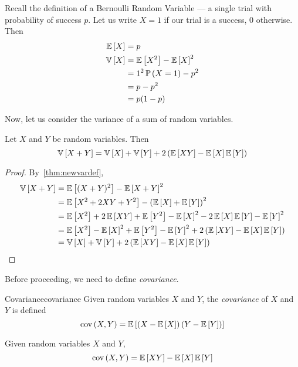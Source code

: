 Recall the definition of a Bernoulli Random Variable --- a single trial with
probability of success $p$. Let us write $X = 1$ if our trial is a success, 0
otherwise. Then
\begin{align*}
    \expectation{X} &= p\\
    \variance{X} &= \expectation{X^2} - \expectation{X}^2\\
                 &= 1^2\prob{X = 1} - p^2\\
                 &= p - p^2\\
                 &= p(1 - p)
\end{align*}

Now, let us consider the variance of a sum of random variables.
\begin{theorem}{}{}
    Let $X$ and $Y$ be random variables. Then
    \[\variance{X + Y} = \variance{X} + \variance{Y} + 2\left(\expectation{XY} - \expectation{X}\expectation{Y}\right)\]
\end{theorem}
\begin{proof}
    By~\cref{thm:newvardef}, 
    \begin{align*}\variance{X + Y}
        &= \expectation{(X + Y)^2} - \expectation{X + Y}^2\\
        &= \expectation{X^2 + 2XY + Y^2} - \left(\expectation{X} + \expectation{Y}\right)^2\\
        &= \expectation{X^2} + 2\expectation{XY} + \expectation{Y^2} - \expectation{X}^2 - 2\expectation{X}\expectation{Y} - \expectation{Y}^2\\
        &= \expectation{X^2} - \expectation{X}^2 + \expectation{Y^2} - \expectation{Y}^2 + 2\left(\expectation{XY} - \expectation{X}\expectation{Y}\right)\\
        &= \variance{X} + \variance{Y} + 2\left(\expectation{XY} - \expectation{X}\expectation{Y}\right)
    \end{align*}
\end{proof}

Before proceeding, we need to define \emph{covariance}.
\begin{definition}{Covariance}{covariance}
    Given random variables $X$ and $Y$, the \emph{covariance} of $X$ and $Y$ is
    defined
    \[\covariance{X}{Y} = \expectation{\left(X - \expectation{X}\right)\left(Y - \expectation{Y}\right)}\]
\end{definition}

\begin{theorem}{}{}
    Given random variables $X$ and $Y$,
    \[\covariance{X}{Y} = \expectation{XY} - \expectation{X}\expectation{Y}\]
\end{theorem}

